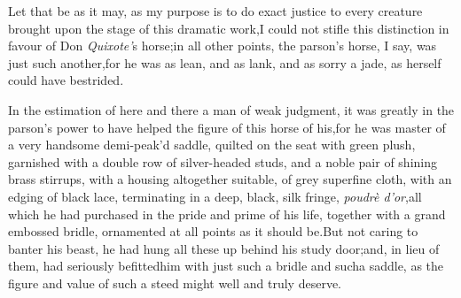 \documentclass{article}
\begin{document}
Let that be as it may, as my purpose is to do exact justice to
every creature brought upon the stage of this dramatic
work,\tsk  I could not stifle this distinction in favour of Don
\textit{Quixote’}s horse;\tsh  in all other points, the
parson’s horse, I say, was just such another,\tsk for he was as
lean, and as lank, and as sorry a jade, as 
herself could have bestrided.

In the estimation of here and there a man of weak judgment, it was greatly
in the parson’s power to have helped the figure of
this horse of his,\tsk  for he was master of a very handsome
demi-peak’d saddle, quilted on the seat with green plush,
garnished with a double row of silver-headed studs, and a noble
pair of shining brass stirrups, with a housing altogether
suitable, of grey superfine cloth, with an edging of black lace,
terminating in a deep, black, silk fringe, \textit{poudrè
d’or},\tsk  all which he had purchased in the pride and prime of
his life, together with a grand embossed bridle, ornamented at
all points as it should be.\tsh  But not caring to banter his
beast, he had hung all these up behind his study door;\tsk and, in
lieu of them, had seriously befitted\break him with just such a bridle
and such\pb a saddle, as the figure and value of such a steed might
well and truly deserve.
\end{document}

